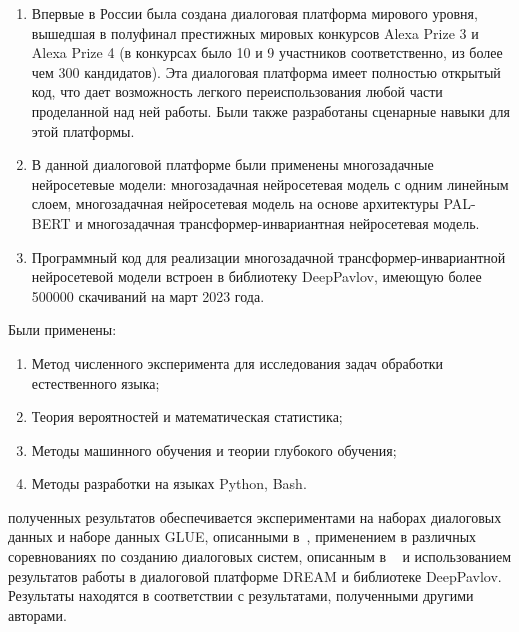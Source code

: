 {\influence}
\begin{enumerate}
   \item Впервые в России была создана диалоговая платформа мирового уровня, вышедшая в полуфинал престижных мировых конкурсов Alexa Prize 3 и Alexa Prize 4 (в конкурсах было 10 и 9 участников соответственно, из более чем 300 кандидатов). Эта диалоговая платформа имеет полностью открытый код, что дает возможность легкого переиспользования любой части проделанной над ней работы. Были также разработаны сценарные навыки для этой платформы.
   \item В данной диалоговой платформе были применены многозадачные нейросетевые модели: многозадачная нейросетевая модель с одним линейным слоем, многозадачная нейросетевая модель на основе архитектуры PAL-BERT и многозадачная трансформер-инвариантная нейросетевая модель.
   \item Программный код для реализации многозадачной трансформер-инвариантной нейросетевой модели встроен в библиотеку DeepPavlov, имеющую более 500000 скачиваний на март 2023 года.
\end{enumerate}

{\methods}
Были
применены: %
\begin{enumerate}
\item Метод численного эксперимента для исследования задач обработки естественного языка;
\item Теория вероятностей и математическая статистика;
\item Методы машинного обучения и теории глубокого обучения;
\item Методы разработки на языках Python, Bash.
\end{enumerate}

{\reliability} полученных результатов обеспечивается экспериментами на наборах диалоговых данных и наборе данных GLUE, описанными в~\cite{pseudolabel,rumtl,enmtl,rutopics,dp_2023}, применением в различных соревнованиях по созданию диалоговых систем, описанным в ~\cite{dream1,dream2,dream1_trudy,Болотин_Карпов_Рашков_Шкурак_2019} и использованием результатов работы в диалоговой платформе DREAM и библиотеке DeepPavlov. Результаты находятся в соответствии с результатами, полученными другими авторами.

